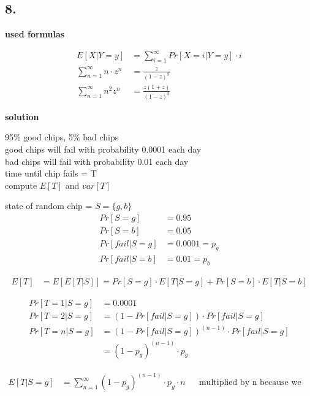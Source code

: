 \subsection*{ 8. }

\textbf{used formulas}

\begin{align*}
E\left[X|Y=y\right]&=\sum _{{i=1}}^{\infty} Pr[X = i| Y = y] \cdot i\\
\sum _{{n=1}}^{\infty}n\cdot z^{n}&=\frac{z}{\left(1-z\right)^{2}}\\
\sum _{{n=1}}^{\infty}n^{2}z^{n} &= \frac{z\left(1+z\right)}{\left(1-z\right)^{3}}
\end{align*}

\textbf{solution}

95\% good chips, 5\% bad chips\\
good chips will fail with probability 0.0001 each day\\
bad chips will fail with probability 0.01 each day\\
time until chip fails =  T\\
compute $E\left[T\right]$ and $var\left[T\right]$

state of random chip =  $S=\{g,b\}$
\begin{align*}
Pr\left[S=g\right]&=0.95\\
Pr\left[S=b\right]&=0.05\\
Pr\left[fail|S=g\right]&=0.0001=p_{g}\\
Pr\left[fail|S=b\right]&=0.01=p_{b}
\end{align*}

\begin{align*}
E\left[T\right]&=E\left[E\left[T|S\right]\right]=Pr\left[S=g\right]\cdot E\left[T|S=g\right]+Pr\left[S=b\right]\cdot E\left[T|S=b\right]
\end{align*}

\begin{align*}
Pr\left[T=1|S=g\right]&=0.0001\\
Pr\left[T=2|S=g\right]&=\left(1-Pr\left[fail|S=g\right]\right)\cdot Pr\left[fail|S=g\right]\\
Pr\left[T=n|S=g\right]&=\left(1-Pr\left[fail|S=g\right]\right)^{\left(n-1\right)}\cdot Pr\left[fail|S=g\right]\\
&=\left(1-p_{g}\right)^{\left(n-1\right)}\cdot p_{g}
\end{align*}

\begin{align*}
E\left[T|S=g\right]&=\sum _{{n=1}}^{\infty}\left(1-p_{g}\right)^{\left(n-1\right)}\cdot p_{g}\cdot n && \text{multiplied by n because we want to sum time, not probabilities}
\end{align*}


